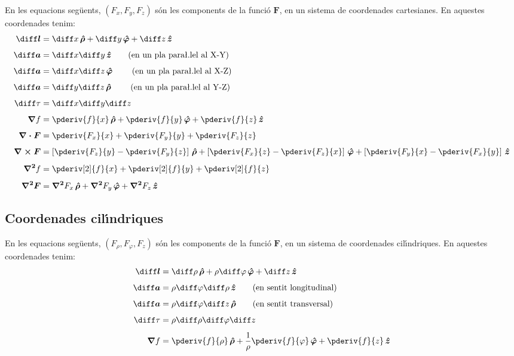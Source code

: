 \documentclass[catalan,a4paper,twoside,11pt]{article}
\begin{document}
En les equacions seg\"{u}ents, $(F_x,F_y,F_z)$  s\'{o}n les
components de la funci\'{o}  $\boldsymbol{F}$, en un sistema de
coordenades cartesianes. En aquestes coordenades tenim:
\begin{align}
    \boldsymbol{\diff l} &= \diff x \va + \diff y \vb + \diff z \vc\\[1ex]
    \boldsymbol{\diff a} &= \diff x \diff y \vc \qquad\text{(en un pla
    para{\l.l}el al X-Y)}\\[1ex]
    \boldsymbol{\diff a} &= \diff x \diff z \vb \qquad\text{ (en un pla
    para{\l.l}el al X-Z)}\\[1ex]
    \boldsymbol{\diff a} &= \diff y \diff z \va \qquad\text{ (en un pla
    para{\l.l}el al Y-Z)}\\[1ex]
    \diff\tau &= \diff x \diff y \diff z\\[1ex]
    \boldsymbol{\nabla}f &= \pderiv{f}{x}\va + \pderiv{f}{y}\vb
    + \pderiv{f}{z}\vc\\[1ex]
    \boldsymbol{\nabla\cdot F} &= \pderiv{F_x}{x} + \pderiv{F_y}{y}
    + \pderiv{F_z}{z}\\[1ex]
    \boldsymbol{\nabla\times F} &= \left[\pderiv{F_z}{y}-\pderiv{F_y}{z}\right]\va +
    \left[\pderiv{F_x}{z}-\pderiv{F_z}{x}\right]\vb +
    \left[\pderiv{F_y}{x}-\pderiv{F_x}{y}\right]\vc\\[1ex]
    \boldsymbol{\nabla^2}f &= \pderiv[2]{f}{x} + \pderiv[2]{f}{y}+ \pderiv[2]{f}{z}\\[1ex]
    \boldsymbol{\nabla^2F} &= \boldsymbol{\nabla^2} F_x \va + \boldsymbol{\nabla^2} F_y
    \vb + \boldsymbol{\nabla^2} F_z \vc
\end{align}

\subsection{Coordenades cil\'{\i}ndriques}

\renewcommand{\va}{\ensuremath{\,\boldsymbol{\hat{\rho}}}}
\renewcommand{\vb}{\ensuremath{\,\boldsymbol{\hat{\varphi}}}}
\renewcommand{\vc}{\ensuremath{\,\boldsymbol{\hat{z}}}}
En les equacions seg\"{u}ents, $(F_\rho,F_\varphi,F_z)$  s\'{o}n les
components de la funci\'{o}  $\boldsymbol{F}$, en un sistema de
coordenades cil\'{\i}ndriques. En aquestes coordenades tenim:
\begin{align}
    \boldsymbol{\diff l} &= \diff \rho \va + \rho\diff \varphi \vb + \diff z \vc\\[1ex]
    \boldsymbol{\diff a} &= \rho\diff \varphi \diff \rho \vc \qquad\text{(en sentit longitudinal)}\\[1ex]
    \boldsymbol{\diff a} &= \rho\diff \varphi \diff z \va \qquad\text{(en sentit transversal)}\\[1ex]
    \diff\tau &= \rho \diff \rho \diff \varphi \diff z\\[1ex]
    \boldsymbol{\nabla}f &= \pderiv{f}{\rho}\va + \frac{1}{\rho}\pderiv{f}{\varphi}\vb
    + \pderiv{f}{z}\vc
\end{align}
\end{document}
